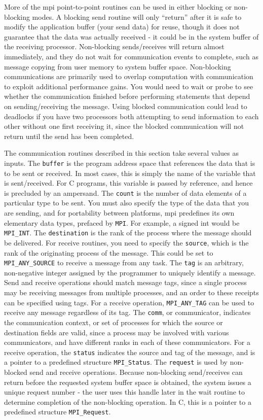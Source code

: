 \documentclass[10pt]{article}
\begin{document}
\begin{flushleft}
More of the \gls{mpi} point-to-point routines can be used in either blocking or non-blocking modes. A blocking send routine will only ``return'' after it is safe to modify the application buffer (your send data) for reuse, though it does not guarantee that the data was actually received - it could be in the system buffer of the receiving processor. Non-blocking sends/receives will return almost immediately, and they do not wait for communication events to complete, such as message copying from user memory to system buffer space. Non-blocking communications are primarily used to overlap computation with communication to exploit additional performance gains. You would need to wait or probe to see whether the communication finished before performing statements that depend on sending/receiving the message. Using blocked communication could lead to deadlocks if you have two processors both attempting to send information to each other without one first receiving it, since the blocked communication will not return until the send has been completed.

The communication routines described in this section take several values as inputs. The {\tt buffer} is the program address space that references the data that is to be sent or received. In most cases, this is simply the name of the variable that is sent/received. For C programs, this variable is passed by reference, and hence is precluded by an ampersand. The {\tt count} is the number of data elements of a particular type to be sent. You must also specify the type of the data that you are sending, and for portability between platforms, \gls{mpi} predefines its own elementary data types, prefaced by {\tt MPI}. For example, a signed int would be {\tt MPI\_INT}. The {\tt destination} is the rank of the process where the message should be delivered. For receive routines, you need to specify the {\tt source}, which is the rank of the originating process of the message. This could be set to {\tt MPI\_ANY\_SOURCE} to receive a message from any task. The {\tt tag} is an arbitrary, non-negative integer assigned by the programmer to uniquely identify a message. Send and receive operations should match message tags, since a single process may be receiving messages from multiple processes, and an order to these receipts can be specified using tags. For a receive operation, {\tt MPI\_ANY\_TAG} can be used to receive any message regardless of its tag. The {\tt comm}, or communicator, indicates the communication context, or set of processes for which the source or destination fields are valid, since a process may be involved with various communicators, and have different ranks in each of these communicators. For a receive operation, the {\tt status} indicates the source and tag of the message, and is a pointer to a predefined structure {\tt MPI\_Status}. The {\tt request} is used by non-blocked send and receive operations. Because non-blocking send/receives can return before the requested system buffer space is obtained, the system issues a unique request number - the user uses this handle later in the wait routine to determine completion of the non-blocking operation. In C, this is a pointer to a predefined structure {\tt MPI\_Request}. 


\end{flushleft}
\end{document}
